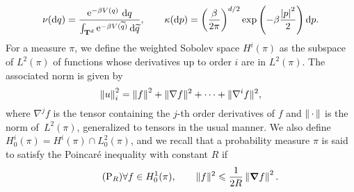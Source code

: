 \documentclass[11pt,a4paper]{article}
\DeclareMathOperator{\e}{e}
\newcommand{\dummy}{\,\cdot\,}
\newcommand{\torus}{\mathbf T}
\newcommand{\grad}{\boldsymbol \nabla}
\renewcommand{\d}{\mathrm d}
\theoremstyle{plain}
\numberwithin{equation}{section}
\renewcommand{\leq}{\leqslant}
\begin{document}
\begin{equation}
    \label{eq:definition_prob_measures}
    \nu(\d q) = \frac{\e^{- \beta V(q)} \, \d q}{\int_{\torus^d}\e^{-\beta V(\widetilde q)} \d \widetilde q},
    \qquad \kappa(\d p) = \left( \frac{\beta}{2 \pi} \right)^{d/2}\exp \left( - \beta \frac{\abs{p}^2}{2} \right) \d p.
\end{equation}
For a measure $\pi$, we define the weighted Sobolev space $H^i(\pi)$ as the subspace of $L^2(\pi)$
of functions whose derivatives up to order $i$ are in $L^2(\pi)$.
The associated norm is given by
\[
    \norm{u}_i^2 = \norm{f}^2 + \norm*{\nabla f}^2 + \dotsb + \norm*{\nabla^i f}^2,
\]
where  $\nabla^j f$ is the tensor containing the $j$-th order derivatives of $f$ and $\norm{\dummy}$ is the norm of~$L^2(\pi)$,
generalized to tensors in the usual manner.
We also define $H^{i}_0(\pi) = H^i(\pi) \cap L^2_0(\pi)$,
and we recall that a probability measure $\pi$ is said to satisfy the Poincaré inequality with constant $R$ if
\begin{equation}
    \label{eq:poincare}
    \tag{P$_R$}
    \forall f \in H^1_0(\pi), \qquad
    \norm*{f}^2 \leq \frac{1}{2R} \norm{\grad f}^2.
\end{equation}
\end{document}
